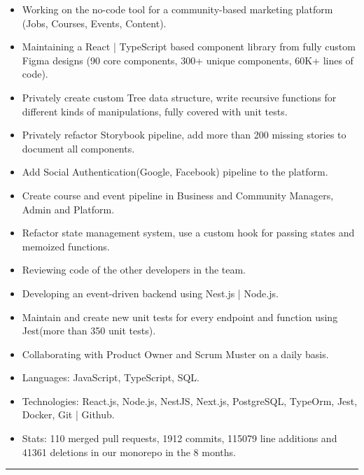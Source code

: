\documentclass[10pt,letterpaper]{article}
\begin{document}
\begin{itemize}
    \begin{itemize}[label=\textbullet]
    \itemsep0.5em
    \item Working on the no-code tool for a community-based marketing platform (Jobs, Courses, Events, Content).
    \item Maintaining a React | TypeScript based component library from fully custom Figma designs (90 core components, 300+ unique components, 60K+ lines of code).
    \item Privately create custom Tree data structure, write recursive functions for different kinds of manipulations, fully covered with unit tests.
    \item Privately refactor Storybook pipeline, add more than 200 missing stories to document all components.
    \item Add Social Authentication(Google, Facebook) pipeline to the platform.
    \item Create course and event pipeline in Business and Community Managers, Admin and Platform.
    \item Refactor state management system, use a custom hook for passing states and memoized functions.
    \item Reviewing code of the other developers in the team.
    \item Developing an event-driven backend using Nest.js | Node.js.
    \item Maintain and create new unit tests for every endpoint and function using Jest(more than 350 unit tests).
    \item Collaborating with Product Owner and Scrum Muster on a daily basis.
    \item Languages: JavaScript, TypeScript, SQL.
    \item Technologies: React.js, Node.js, NestJS, Next.js, PostgreSQL, TypeOrm, Jest, Docker, Git | Github.
    \item Stats: 110 merged pull requests, 1912 commits, 115079 line additions and 41361 deletions in our monorepo in the 8 months.
    \end{itemize}
\end{itemize}

\hrule
\vspace{-1.0em}
\end{document}
